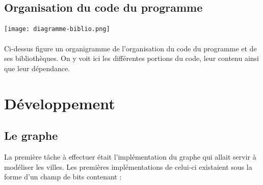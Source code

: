 \documentclass[a4paper, 12pt]{article}
\begin{document}
\subsection{Organisation du code du programme}
\paragraph{\newline\newline}
\texttt{[image: diagramme-biblio.png]}
\paragraph{\newline\newline}
Ci-dessus figure un organigramme de l'organisation du code du programme et de ses bibliothèques. On y voit ici les différentes portions du code, leur contenu ainsi que leur dépendance.



 \newpage
 
\section{Développement}
    \subsection{Le graphe}
        La première tâche à effectuer était l'implémentation du graphe qui allait servir à modéliser les villes.
        Les premières implémentations de celui-ci existaient sous la forme d'un champ de bits contenant :
        
\end{document}

